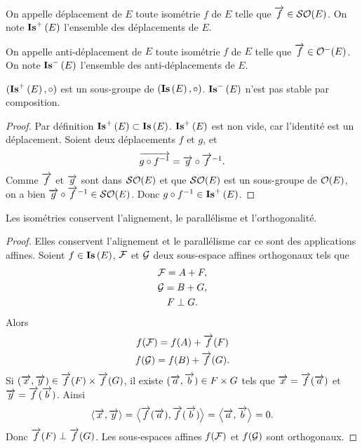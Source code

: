 \begin{defdef}
  On appelle déplacement de $E$ toute isométrie $f$ de $E$ telle que $\overrightarrow{f} \in \mathcal{SO}\!\left(E\right)$. On note $\mathbf{Is}^{+}\left(E\right)$ l'ensemble des déplacements de $E$.

  On appelle anti-déplacement de $E$ toute isométrie $f$ de $E$ telle que $\overrightarrow{f} \in \mathcal{O}^{-}\!\left(E\right)$. On note $\mathbf{Is}^{-}\left(E\right)$ l'ensemble des anti-déplacements de $E$.
\end{defdef}

\begin{prop}
  $(\mathbf{Is}^{+}\left(E\right), \circ)$ est un sous-groupe de $(\mathbf{Is}\left(E\right), \circ)$. $\mathbf{Is}^{-}\left(E\right)$ n'est pas stable par composition.
\end{prop}
\begin{proof}
  Par définition $\mathbf{Is}^{+}\left(E\right) \subset \mathbf{Is}\left(E\right)$. $\mathbf{Is}^{+}\left(E\right)$ est non vide, car l'identité est un déplacement. Soient deux déplacements $f$ et $g$, et
  \begin{equation}
    \overrightarrow{g \circ f^{-1}}=\overrightarrow{g} \circ \overrightarrow{f}^{-1}.
  \end{equation}
  Comme $\overrightarrow{f}$ et $\overrightarrow{g}$ sont dans $\mathcal{SO}\!\left(E\right)$ et que $\mathcal{SO}\!\left(E\right)$ est un sous-groupe de $\mathcal{O}\!\left(E\right)$, on a bien $\overrightarrow{g} \circ \overrightarrow{f}^{-1} \in \mathcal{SO}\!\left(E\right)$. Donc $g \circ f^{-1} \in \mathbf{Is}^{+}\left(E\right)$.
\end{proof}

\begin{prop}
  Les isométries conservent l'alignement, le parallélisme et l'orthogonalité.
\end{prop}
\begin{proof}
  Elles conservent l'alignement et le parallélisme car ce sont des applications affines. Soient $f \in \mathbf{Is}\left(E\right)$, $\mathcal{F}$ et $\mathcal{G}$ deux sous-espace affines orthogonaux tels que
  \begin{gather}
    \mathcal{F} = A+F, \\
    \mathcal{G} = B+G,\\
    F \perp G.
  \end{gather}
  Alors
  \begin{gather}
    f(\mathcal{F}) = f(A) + \overrightarrow{f}(F) \\
    f(\mathcal{G}) = f(B) + \overrightarrow{f}(G).
  \end{gather}
  Si $(\overrightarrow{x}, \overrightarrow{y}) \in \overrightarrow{f}(F) \times \overrightarrow{f}(G)$, il existe $(\overrightarrow{a}, \overrightarrow{b}) \in F \times G$ tels que $\overrightarrow{x}=\overrightarrow{f}(\overrightarrow{a})$  et $\overrightarrow{y}=\overrightarrow{f}(\overrightarrow{b})$. Ainsi
  \begin{equation}
    \left\langle{\overrightarrow{x}},{\overrightarrow{y}}\right\rangle = \left\langle{\overrightarrow{f}(\overrightarrow{a})},{\overrightarrow{f}(\overrightarrow{b})}\right\rangle = \left\langle{\overrightarrow{a}},{\overrightarrow{b}}\right\rangle =0.
  \end{equation}
  Donc $\overrightarrow{f}(F) \perp \overrightarrow{f}(G)$. Les sous-espaces affines $f(\mathcal{F})$ et $f(\mathcal{G})$ sont orthogonaux.
\end{proof}

